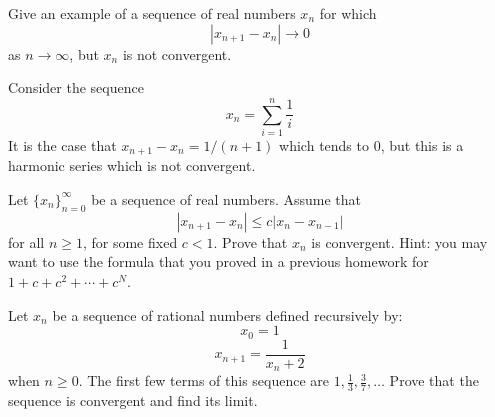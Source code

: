   \begin{exercise}
    Give an example of a sequence of real numbers $x_n$ for which
    \begin{equation}
      |x_{n+1} - x_n| \to 0
    \end{equation}
    as $n \to \infty$, but $x_n$ is not convergent.
  \end{exercise}
  \begin{solution}
    Consider the sequence 
    \begin{equation}
      x_n = \sum_{i=1}^n \frac{1}{i}
    \end{equation} 
    It is the case that $x_{n+1} - x_n = 1/(n+1)$ which tends to $0$, but this is a harmonic series which is not convergent. 
  \end{solution}

  \begin{exercise}
    Let $\{x_n\}_{n=0}^{\infty}$ be a sequence of real numbers. Assume that
    \begin{equation}
      |x_{n+1} - x_n| \leq c|x_n - x_{n-1}|
    \end{equation}
    for all $n \geq 1$, for some fixed $c < 1$. Prove that $x_n$ is convergent. Hint: you may want to use the formula that you proved in a previous homework for $1 + c + c^2 + \cdots + c^N$.
  \end{exercise}
  \begin{solution}
    
  \end{solution}

  \begin{exercise}
    Let $x_n$ be a sequence of rational numbers defined recursively by:
    \begin{equation}
      x_0 = 1
    \end{equation}
    \begin{equation}
      x_{n+1} = \frac{1}{x_n + 2}
    \end{equation}
    when $n \geq 0$. The first few terms of this sequence are $1, \frac{1}{3}, \frac{3}{7}, \ldots$ Prove that the sequence is convergent and find its limit.
  \end{exercise}
  \begin{solution}
    
  \end{solution}

